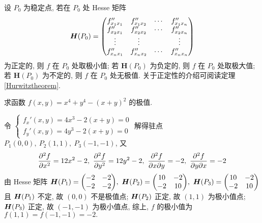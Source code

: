 \begin{theorem}
    设 $ P_{0} $ 为稳定点, 若在 $ P_{0} $ 处 Hesse 矩阵
    $$\vb*{H}(P_0)=\mqty(f_{x_{1} x_{1}}^{\prime \prime} & f_{x_{1} x_{2}}^{\prime \prime} & \cdots & f_{x_{1} x_{n}}^{\prime \prime} \\
        f_{x_{2} x_{1}}^{\prime \prime} & f_{x_{2} x_{2}}^{\prime \prime} & \cdots & f_{x_{2} x_{n}}^{\prime \prime} \\
        \vdots & \vdots & & \vdots \\
        f_{x_{n} x_{1}}^{\prime \prime} & f_{x_{n} x_{2}}^{\prime \prime} & \cdots & f_{x_{n} x_{n}}^{\prime \prime})$$
    为正定的, 则 $ f $ 在 $ P_{0} $ 处取极小值; 若 $ \boldsymbol{H}\left(P_{0}\right) $ 为负定的, 则 $ f $ 在 $ P_{0} $ 处取极大值; 
    若 $ \boldsymbol{H}\left(P_{0}\right) $ 为不定的, 则 $ f $ 在 $ P_{0} $ 处无极值. 关于正定性的介绍可阅读定理 \ref{Hurwitztheorem}.
\end{theorem}

\begin{example}
    求函数 $f(x,y)=x^4+y^4-(x+y)^2$ 的极值.
\end{example}
\begin{solution}
    令 $\begin{cases}
        f_x'(x,y)=4x^3-2(x+y)=0\\
        f_y'(x,y)=4y^3-2(x+y)=0
    \end{cases}$ 解得驻点 $P_1(0,0),~P_2(1,1),~P_3(-1,-1)$, 又 
    $$\displaystyle \pdv[2]{f}{x}=12x^2-2,~\pdv[2]{f}{y}=12y^2-2,~\pdv{f}{x}{y}=-2,~\pdv{f}{y}{x}=-2$$
    由 Hesse 矩阵 $\vb*{H}(P_1)=\mqty(-2&-2\\-2&-2),~\vb*{H}(P_2)=\mqty(10&-2\\-2&10),~\vb*{H}(P_3)=\mqty(10&-2\\-2&10)$ 且 $\vb*{H}(P_1)$ 不定, 故 $(0,0)$ 不是极值点; 
    $\vb*{H}(P_2)$ 正定, 故 $(1,1)$ 为极小值点; $\vb*{H}(P_3)$ 正定, 故 $(-1,-1)$ 为极小值点, 
    综上, $f$ 的极小值为 $f(1,1)=f(-1,-1)=-2.$
\end{solution}


